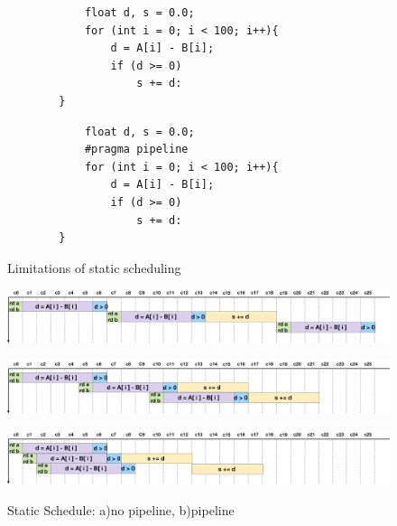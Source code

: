\begin{figure}[ht]
    \begin{minipage}{0.4\linewidth}
        \begin{verbatim}
            float d, s = 0.0;
            for (int i = 0; i < 100; i++){
                d = A[i] - B[i];
                if (d >= 0)
                    s += d:
        }
    \end{verbatim}
    \end{minipage}
    \begin{minipage}{0.45\linewidth}
        \begin{verbatim}
            float d, s = 0.0;
            #pragma pipeline
            for (int i = 0; i < 100; i++){
                d = A[i] - B[i];
                if (d >= 0)
                    s += d:
        }
    \end{verbatim}

    \end{minipage}



    \caption{Limitations of static scheduling}
    \label{listing:static_schedule}
\end{figure}


\begin{figure}[!h]
    \begin{minipage}[t]{\linewidth}
        \centering
        \includegraphics[width=1\textwidth]{figures/Introduction/schedule.pdf}
        \label{fig:no_pipeline}
    \end{minipage}
    \hspace{0.1cm}
    \begin{minipage}[t]{\linewidth} 
        \centering
        \includegraphics[width=1\textwidth]{figures/Introduction/schedule_pipe.pdf}
        \label{fig:pipeline}
    \end{minipage}        
    \begin{minipage}[t]{\linewidth} 
        \centering
        \includegraphics[width=1\textwidth]{figures/Introduction/schedule_dynamic.pdf}
        \label{fig:dynamic_schedule}
    \end{minipage}        
    \label{fig:schedule}
    \caption{Static Schedule: a)no pipeline, b)pipeline}
\end{figure}  


